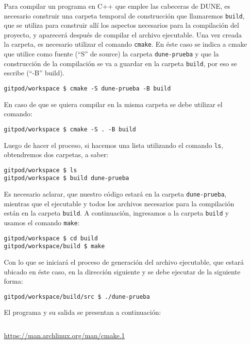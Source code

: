 Para compilar un programa en C++ que emplee las cabeceras de DUNE, es
necesario construir una carpeta temporal de construcción que
llamaremos \verb|build|, que se utiliza para construir allí los
aspectos necesarios para la compilación del proyecto, y aparecerá
después de compilar el archivo ejecutable.
Una vez creada la carpeta, es necesario utilizar el comando
\verb|cmake|.
En éste caso se indica a cmake que utilice como fuente
(``S'' de source) la carpeta \verb|dune-prueba| y que la construcción
de la compilación se va a guardar en la carpeta \verb|build|, por eso
se escribe (``-B'' build).

\begin{verbatim}
gitpod/workspace $ cmake -S dune-prueba -B build
\end{verbatim}

En caso de que se quiera compilar en la misma carpeta se debe
utilizar el comando:
\begin{verbatim}
gitpod/workspace $ cmake -S . -B build
\end{verbatim}

Luego de hacer el proceso, si hacemos una lista utilizando el comando
\verb|ls|, obtendremos dos carpetas, a saber:

\begin{verbatim}
gitpod/workspace $ ls
gitpod/workspace $ build dune-prueba
\end{verbatim}

Es necesario aclarar, que nuestro código estará en la carpeta
\verb|dune-prueba|, mientras que el ejecutable y todos los archivos
necesarios para la compilación están en la carpeta \verb|build|.
A continuación, ingresamos a la carpeta \verb|build| y usamos el
comando \verb|make|:

\begin{verbatim}
gitpod/workspace $ cd build
gitpod/workspace/build $ make
\end{verbatim}

Con lo que se iniciará el proceso de generación del archivo
ejecutable, que estará ubicado en éste caso, en la dirección
siguiente y se debe ejecutar de la siguiente forma:

\begin{verbatim}
gitpod/workspace/build/src $ ./dune-prueba
\end{verbatim}

El programa y su salida se presentan a continuación:
\begin{listing}[ht!]
	\inputminted{bash}{dune-learn-1.txt}
\end{listing}

\url{https://man.archlinux.org/man/cmake.1}